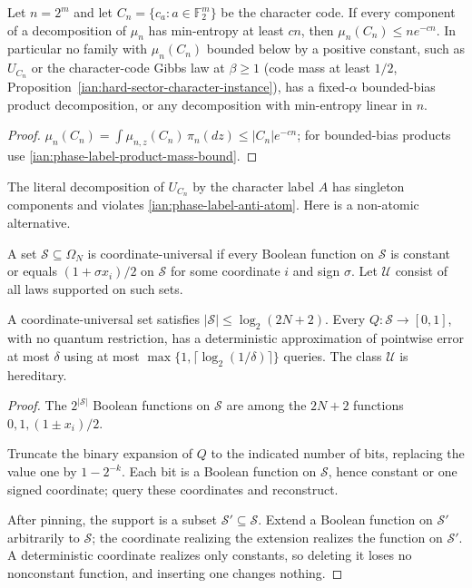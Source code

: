 \begin{proposition}
\label{ian:phase-label-code-entropy-limitation}
Let \(n=2^m\) and let \(C_n=\{c_a:a\in\mathbb F_2^m\}\) be the character
code. If every component of a decomposition of \(\mu_n\) has min-entropy
at least \(cn\), then \(\mu_n(C_n)\le ne^{-cn}\). In particular no
family with \(\mu_n(C_n)\) bounded below by a positive constant, such as \(U_{C_n}\) or the
character-code Gibbs law at \(\beta\ge1\) (code mass at least \(1/2\),
Proposition~\ref{ian:hard-sector-character-instance}), has a fixed-\(\alpha\)
bounded-bias product decomposition, or any decomposition with
min-entropy linear in \(n\).
\end{proposition}

\begin{proof}
\(\mu_n(C_n)=\int\mu_{n,z}(C_n)\,\pi_n(dz)\le|C_n|e^{-cn}\); for
bounded-bias products use \eqref{ian:phase-label-product-mass-bound}.
\end{proof}

The literal decomposition of \(U_{C_n}\) by the character label \(A\) has
singleton components and violates \eqref{ian:phase-label-anti-atom}.
Here is a non-atomic alternative.

\begin{definition}
\label{ian:phase-label-coordinate-universal}
A set \(\mathcal S\subseteq\Omega_N\) is coordinate-universal if every
Boolean function on \(\mathcal S\) is constant or equals
\((1+\sigma x_i)/2\) on \(\mathcal S\) for some coordinate \(i\) and sign
\(\sigma\). Let \(\mathcal U\) consist of all laws supported on such
sets.
\end{definition}

\begin{lemma}
\label{ian:phase-label-universal-support-simulation}
A coordinate-universal set satisfies \(|\mathcal S|\le\log_2(2N+2)\).
Every \(Q:\mathcal S\to[0,1]\), with no quantum restriction, has a
deterministic approximation of pointwise error at most \(\delta\) using
at most \(\max\{1,\lceil\log_2(1/\delta)\rceil\}\) queries. The class
\(\mathcal U\) is hereditary.
\end{lemma}

\begin{proof}
The \(2^{|\mathcal S|}\) Boolean functions on \(\mathcal S\) are among
the \(2N+2\) functions \(0,1,(1\pm x_i)/2\).

Truncate the binary expansion of \(Q\) to the indicated number of bits,
replacing the value one by \(1-2^{-k}\). Each bit is a Boolean function
on \(\mathcal S\), hence constant or one signed coordinate; query these
coordinates and reconstruct.

After pinning, the support is a subset \(\mathcal S'\subseteq\mathcal S\).
Extend a Boolean function on \(\mathcal S'\) arbitrarily to
\(\mathcal S\); the coordinate realizing the extension realizes the
function on \(\mathcal S'\). A deterministic coordinate realizes only
constants, so deleting it loses no nonconstant function, and inserting
one changes nothing.
\end{proof}

